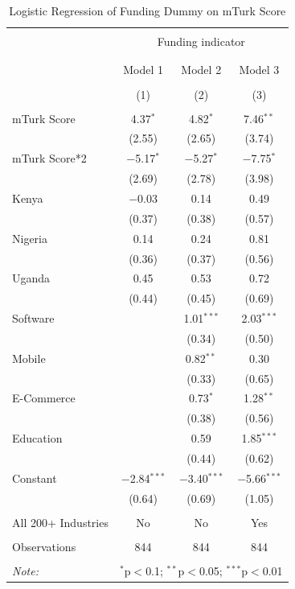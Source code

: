 \documentclass[12pt]{article}
\begin{document}
\begin{table}[!htbp] \centering 
  \caption{Logistic Regression of Funding Dummy on mTurk Score} 
  \label{} 
\footnotesize
\begin{tabular}{@{\extracolsep{5pt}}lccc} 
\\[-1.8ex]\hline 
\hline \\[-1.8ex] 
 & \multicolumn{3}{c}{Funding indicator} \\ 
\cline{2-4} 
\\[-1.8ex] & \multicolumn{3}{c}{} \\ 
 & Model 1 & Model 2 & Model 3 \\ 
\\[-1.8ex] & (1) & (2) & (3)\\ 
\hline \\[-1.8ex] 
 mTurk Score & 4.37$^{*}$ & 4.82$^{*}$ & 7.46$^{**}$ \\ 
  & (2.55) & (2.65) & (3.74) \\ 
  mTurk Score*2 & $-$5.17$^{*}$ & $-$5.27$^{*}$ & $-$7.75$^{*}$ \\ 
  & (2.69) & (2.78) & (3.98) \\ 
  Kenya & $-$0.03 & 0.14 & 0.49 \\ 
  & (0.37) & (0.38) & (0.57) \\ 
  Nigeria & 0.14 & 0.24 & 0.81 \\ 
  & (0.36) & (0.37) & (0.56) \\ 
  Uganda & 0.45 & 0.53 & 0.72 \\ 
  & (0.44) & (0.45) & (0.69) \\ 
  Software &  & 1.01$^{***}$ & 2.03$^{***}$ \\ 
  &  & (0.34) & (0.50) \\ 
  Mobile &  & 0.82$^{**}$ & 0.30 \\ 
  &  & (0.33) & (0.65) \\ 
  E-Commerce &  & 0.73$^{*}$ & 1.28$^{**}$ \\ 
  &  & (0.38) & (0.56) \\ 
  Education &  & 0.59 & 1.85$^{***}$ \\ 
  &  & (0.44) & (0.62) \\ 
  Constant & $-$2.84$^{***}$ & $-$3.40$^{***}$ & $-$5.66$^{***}$ \\ 
  & (0.64) & (0.69) & (1.05) \\ 
 \hline \\[-1.8ex] 
 All 200+ Industries & No & No & Yes  \\ 
 \hline \\[-1.8ex] 
Observations & 844 & 844 & 844 \\ 
\hline 
\hline \\[-1.8ex] 
\textit{Note:}  & \multicolumn{3}{r}{$^{*}$p$<$0.1; $^{**}$p$<$0.05; $^{***}$p$<$0.01} \\ 
\end{tabular} 
\end{table} 
\end{document}
